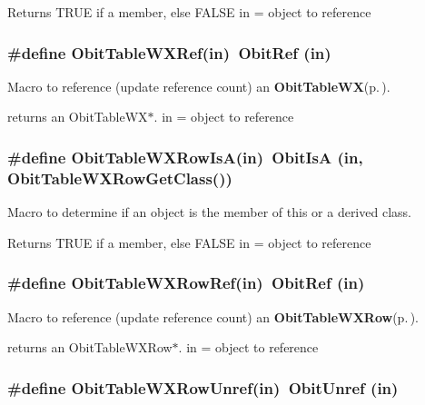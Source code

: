 Returns TRUE if a member, else FALSE in = object to reference 
\subsubsection{\setlength{\rightskip}{0pt plus 5cm}\#define Obit\-Table\-WXRef(in)\ Obit\-Ref (in)}\label{ObitTableWX_8h_a2}


Macro to reference (update reference count) an {\bf Obit\-Table\-WX}{\rm (p.\,\pageref{structObitTableWX})}. 

returns an Obit\-Table\-WX$\ast$. in = object to reference 
\subsubsection{\setlength{\rightskip}{0pt plus 5cm}\#define Obit\-Table\-WXRow\-Is\-A(in)\ Obit\-Is\-A (in, Obit\-Table\-WXRow\-Get\-Class())}\label{ObitTableWX_8h_a6}


Macro to determine if an object is the member of this or a derived class. 

Returns TRUE if a member, else FALSE in = object to reference 
\subsubsection{\setlength{\rightskip}{0pt plus 5cm}\#define Obit\-Table\-WXRow\-Ref(in)\ Obit\-Ref (in)}\label{ObitTableWX_8h_a5}


Macro to reference (update reference count) an {\bf Obit\-Table\-WXRow}{\rm (p.\,\pageref{structObitTableWXRow})}. 

returns an Obit\-Table\-WXRow$\ast$. in = object to reference 
\subsubsection{\setlength{\rightskip}{0pt plus 5cm}\#define Obit\-Table\-WXRow\-Unref(in)\ Obit\-Unref (in)}\label{ObitTableWX_8h_a4}


